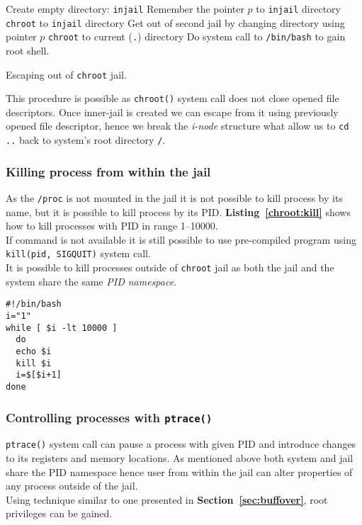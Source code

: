 \documentclass[12pt, a4paper, pdflatex]{article}
\begin{document}
\SetAlCapSkip{1em}
\LinesNumbered
{}
\vspace{1em}
\begin{algorithm}[h]
  Create empty directory: \texttt{injail}\;
  Remember the pointer $p$ to \texttt{injail} directory\;
  \texttt{chroot} to \texttt{injail} directory\;
  Get out of second jail by changing directory using pointer $p$\;
  \texttt{chroot} to current (\texttt{.}) directory\;
  Do system call to \texttt{/bin/bash} to gain root shell.
  \caption{Escaping out of \texttt{chroot} jail.\label{alg:chroot:cd}}
\end{algorithm}
\vspace{1em}

This procedure is possible as \texttt{chroot()} system call does not close opened file descriptors. Once inner-jail is created we can escape from it using previously opened file descriptor, hence we break the \emph{i-node} structure what allow us to \texttt{cd ..} back to system's root directory \texttt{/}.

\subsubsection{Killing process from within the jail}
As the \texttt{/proc} is not mounted in the jail it is not possible to kill process by its name, but it is possible to kill process by its PID. \textbf{Listing~\ref{chroot:kill}} shows how to kill processes with PID in range 1--10000.\\
If command is not available it is still possible to use pre-compiled program using \texttt{kill(pid, SIGQUIT)} system call.\\
It is possible to kill processes outside of \texttt{chroot} jail as both the jail and the system share the same \emph{PID namespace}.


\vspace{1em}
\lstset{
  captionpos=b,
  frame=single,
  language=bash,
  breaklines=true,
  caption=Kill processes outside of chroot jail.,
  label=chroot:kill
}
\begin{lstlisting}
#!/bin/bash
i="1"
while [ $i -lt 10000 ]
  do
  echo $i
  kill $i
  i=$[$i+1]
done
\end{lstlisting}

\subsubsection{Controlling processes with \texttt{ptrace()}}
\texttt{ptrace()} system call can pause a process with given PID and introduce changes to its registers and memory locations. As mentioned above both system and jail share the PID namespace hence user from within the jail can alter properties of any process outside of the jail.\\
Using technique similar to one presented in \textbf{Section~\ref{sec:buffover}}, root privileges can be gained.
\end{document}
